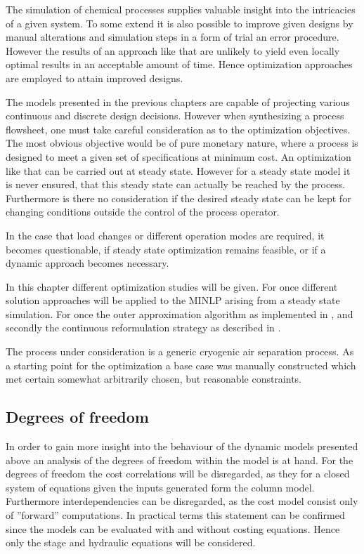 The simulation of chemical processes supplies valuable insight into the intricacies of a given system. 
To some extend it is also possible to improve given designs by manual alterations and simulation
steps in a form of trial an error procedure. However the results of an approach like that are unlikely 
to yield even locally optimal results in an acceptable amount of time. Hence optimization approaches
are employed to attain improved designs. 

The models presented in the previous chapters are capable of projecting various continuous and 
discrete design decisions. However when synthesizing a process flowsheet, one must take careful 
consideration as to the optimization objectives. The most obvious objective would be of 
pure monetary nature, where a process is designed to meet a given set of specifications 
at minimum cost. An optimization like that can be carried out at steady state. However for
a steady state model it is never ensured, that this steady state can actually be reached 
by the process. Furthermore is there no consideration if the desired steady state can be kept for
changing conditions outside the control of the process operator. 

In the case that load changes or different operation modes are required, it becomes questionable, 
if steady state optimization remains feasible, or if a dynamic approach becomes necessary. 

In this chapter different optimization studies will be given. For once different solution approaches 
will be applied to the MINLP arising from a steady state simulation. For once the outer approximation 
algorithm as implemented in \gproms, and secondly the continuous reformulation strategy as described 
in . 

The process under consideration is a generic cryogenic air separation process. As a starting point for the 
optimization a base case was manually constructed which met certain somewhat arbitrarily chosen, 
but reasonable constraints.  


    \subsection{Degrees of freedom}
    In order to gain more insight into the behaviour of the dynamic models presented above an analysis
    of the degrees of freedom within the model is at hand. For the degrees of freedom the cost correlations
    will be disregarded, as they for a closed system of equations given the inputs generated form the column
    model. Furthermore interdependencies can be disregarded, as the cost model consist only of ''forward''
    computations. In practical terms this statement can be confirmed since the models can be evaluated
    with and without costing equations. Hence only the stage and hydraulic equations will be considered.

